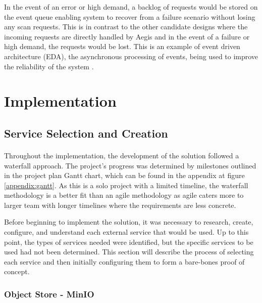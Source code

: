 \documentclass[12pt, conference, final, a4paper, onecolumn, compsoc]{IEEEtran}
\begin{document}
In the event of an error or high demand, a backlog of requests would be stored
on the event queue enabling system to recover from a failure scenario without
losing any scan requests. This is in contrast to the other candidate designs
where the incoming requests are directly handled by Aegis and in the event of a
failure or high demand, the requests would be lost. This is an example of event
driven architecture (EDA), the asynchronous processing of events, being used to improve the reliability of the system \citep{event-driven-arch}.

\section{Implementation}

\subsection{Service Selection and Creation}
\paragraph{}

Throughout the implementation, the development of the solution followed a
waterfall approach. The project's progress was determined by milestones outlined
in the project plan Gantt chart, which can be found in the appendix at figure
\ref{appendix:gantt}. As this is a solo project with a limited timeline, the
waterfall methodology is a better fit than an agile methodology as agile caters
more to larger team with longer timelines where the requirements are less
concrete.

Before beginning to implement the solution, it was necessary to research,
create, configure, and understand each external service that would be used. Up
to this point, the types of services needed were identified, but the specific
services to be used had not been determined. This section will describe the
process of selecting each service and then initially configuring them to form a
bare-bones proof of concept.

\subsubsection*{Object Store - MinIO}
\paragraph{}
\end{document}
